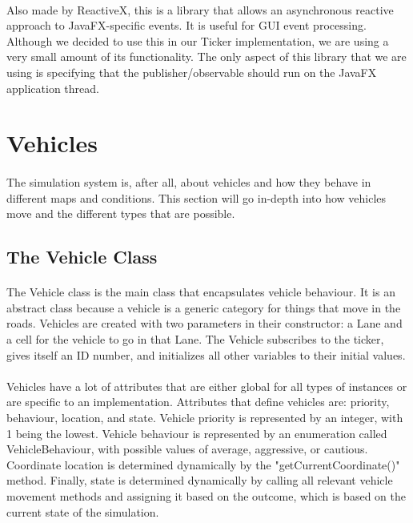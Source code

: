 \documentclass[a4paper,11pt,titlepage]{article}
\begin{document}
\paragraph{}
Also made by ReactiveX, this is a library that allows an asynchronous reactive approach to JavaFX-specific events. It is useful for GUI event processing. Although we decided to use this in our Ticker implementation, we are using a very small amount of its functionality. The only aspect of this library that we are using is specifying that the publisher/observable should run on the JavaFX application thread.

\section{Vehicles}
\paragraph{}
The simulation system is, after all, about vehicles and how they behave in different maps and conditions. This section will go in-depth into how vehicles move and the different types that are possible.
\subsection{The Vehicle Class}
\paragraph{}
The Vehicle class is the main class that encapsulates vehicle behaviour. It is an abstract class because a vehicle is a generic category for things that move in the roads. Vehicles are created with two parameters in their constructor: a Lane and a cell for the vehicle to go in that Lane. The Vehicle subscribes to the ticker, gives itself an ID number, and initializes all other variables to their initial values. 
\paragraph{}
Vehicles have a lot of attributes that are either global for all types of instances or are specific to an implementation. Attributes that define vehicles are: priority, behaviour, location, and state. Vehicle priority is represented by an integer, with 1 being the lowest. Vehicle behaviour is represented by an enumeration called VehicleBehaviour, with possible values of average, aggressive, or cautious. Coordinate location is determined dynamically by the "getCurrentCoordinate()" method. Finally, state is determined dynamically by calling all relevant vehicle movement methods and assigning it based on the outcome, which is based on the current state of the simulation.
\end{document}
